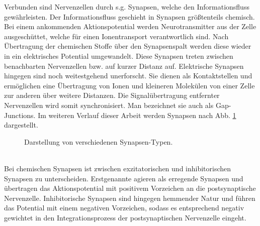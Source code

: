 	Verbunden sind Nervenzellen durch s.g. Synapsen, welche den Informationsfluss gewährleisten. Der Informationsfluss geschieht in Synapsen größtenteils chemisch. Bei einem ankommenden Aktionspotential werden Neurotransmitter aus der Zelle ausgeschüttet, welche für einen Ionentransport verantwortlich sind. Nach Übertragung der chemischen Stoffe über den Synapsenspalt werden diese wieder in ein elektrisches Potential umgewandelt. Diese Synapsen treten zwischen benachbarten Nervenzellen bzw. auf kurzer Distanz auf. Elektrische Synapsen hingegen sind noch weitestgehend unerforscht. Sie dienen als Kontaktstellen und ermöglichen eine Übertragung von Ionen und kleineren Molekülen von einer Zelle zur anderen über weitere Distanzen. Die Signalübertragung entfernter Nervenzellen wird somit synchronisiert. Man bezeichnet sie auch als \glqq Gap-Junctions\grqq. Im weiteren Verlauf dieser Arbeit werden Synapsen nach Abb. \ref{fig:synapse} dargestellt.\\
	\begin{figure}[!h] %
		\centering
		\def\svgwidth{12cm}
		
		\caption{Darstellung von verschiedenen Synapsen-Typen.}
		\label{fig:synapse}
	\end{figure}\\
	Bei chemischen Synapsen ist zwischen exzitatorischen und inhibitorischen Synapsen zu unterscheiden. Erstgenannte agieren als erregende Synapsen und übertragen das Aktionspotential mit positivem Vorzeichen an die postsynaptische Nervenzelle. Inhibitorische Synapsen sind hingegen hemmender Natur und führen das Potential mit einem negativen Vorzeichen, sodass es entsprechend negativ gewichtet in den Integrationsprozess der postsynaptischen Nervenzelle eingeht.
